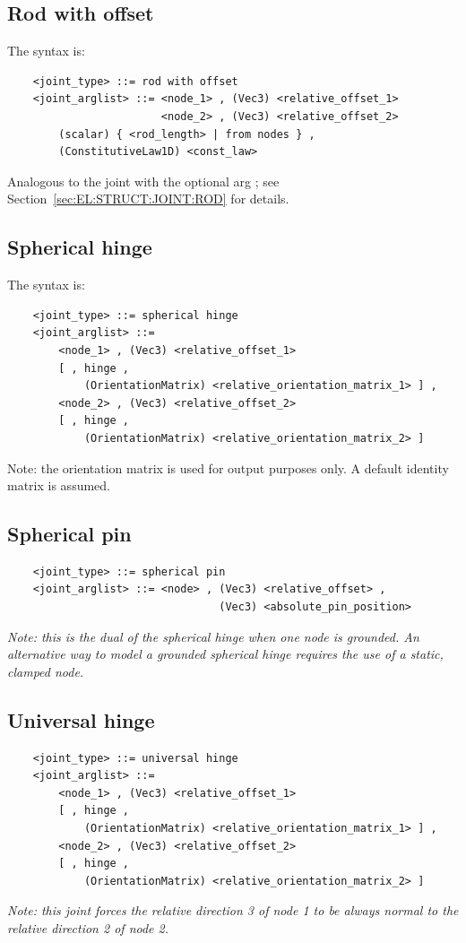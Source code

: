 \subsection{Rod with offset}\label{sec:EL:STRUCT:JOINT:ROD_WITH_OFFSET}
The syntax is:
\begin{verbatim}
    <joint_type> ::= rod with offset
    <joint_arglist> ::= <node_1> , (Vec3) <relative_offset_1>
                        <node_2> , (Vec3) <relative_offset_2>
        (scalar) { <rod_length> | from nodes } ,
        (ConstitutiveLaw1D) <const_law>
\end{verbatim}
Analogous to the  joint with the optional arg ;
see Section~\ref{sec:EL:STRUCT:JOINT:ROD} for details.

\subsection{Spherical hinge}
The syntax is:
\begin{verbatim}
    <joint_type> ::= spherical hinge
    <joint_arglist> ::= 
        <node_1> , (Vec3) <relative_offset_1> 
        [ , hinge , 
            (OrientationMatrix) <relative_orientation_matrix_1> ] ,
        <node_2> , (Vec3) <relative_offset_2>
        [ , hinge , 
            (OrientationMatrix) <relative_orientation_matrix_2> ]
\end{verbatim}
Note: the orientation matrix is used for output purposes only. 
A default identity matrix is assumed.

\subsection{Spherical pin}
\begin{verbatim}
    <joint_type> ::= spherical pin
    <joint_arglist> ::= <node> , (Vec3) <relative_offset> ,
                                 (Vec3) <absolute_pin_position>
\end{verbatim}
{\em
    Note: this is the dual of the spherical hinge when one node is grounded.
    An alternative way to model a grounded spherical hinge requires the use
    of a static, clamped node.
}

\subsection{Universal hinge}
\begin{verbatim}
    <joint_type> ::= universal hinge
    <joint_arglist> ::= 
        <node_1> , (Vec3) <relative_offset_1> 
        [ , hinge , 
            (OrientationMatrix) <relative_orientation_matrix_1> ] ,
        <node_2> , (Vec3) <relative_offset_2>
        [ , hinge , 
            (OrientationMatrix) <relative_orientation_matrix_2> ]
\end{verbatim}
{\em
    Note: this joint forces the relative direction 3 of node 1 to be always 
    normal to the relative direction 2 of node 2.
}

